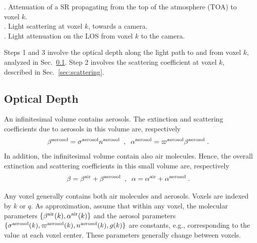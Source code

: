\documentclass[10pt,twocolumn,letterpaper]{article}
\newcommand{\yoavcomment}[1]{}
\renewcommand{\yoavcomment}[1]{#1} %
\begin{document}
\vspace{-0.35cm}
. Attenuation of a SR propagating from the top of the atmosphere
  (TOA) to voxel $k$. \\

\vspace{-0.35cm}
. Light scattering at voxel $k$, towards a camera.\\

\vspace{-0.35cm}
. Light attenuation on the LOS from voxel $k$ to the camera.

\noindent
Steps 1 and 3 involve the optical depth
along the light path to and from voxel $k$, analyzed in Sec.~\ref{sec:optical-depth}.
Step 2 involves the scattering coefficient at voxel $k$,
described in Sec.~\ref{sec:scattering}.
%

\subsection{Optical Depth}
\label{sec:optical-depth}

An infinitesimal volume contains aerosols. The extinction and scattering coefficients due to aerosols in this volume are, respectively
\begin{equation}
  \beta^{\rm aerosol}=\sigma^{\rm aerosol} n^{\rm aerosol}
  \;\;,\;\;
  \alpha^{\rm aerosol}=\varpi^{\rm aerosol} \beta^{\rm aerosol}
  \;.
  \label{eq:betaer}
\end{equation}
In addition, the infinitesimal volume contain also air molecules. Hence, the overall
extinction and scattering coefficients in this small volume are, respectively
\begin{equation}
  \beta=\beta^{\rm air}+\beta^{\rm aerosol}
  \;\;,\;\;
  \alpha=\alpha^{\rm air}+\alpha^{\rm aerosol}
  \;.
  \label{eq:betair}
\end{equation}

Any voxel generally contains both air molecules and aerosols. Voxels are indexed by $k$ or $q$. As approximation, assume that within any voxel, the molecular parameters
$\{ \beta^{\rm air}(k),\alpha^{\rm air}(k)\}$ and the aerosol parameters
$\{ \sigma^{\rm aerosol}(k),\varpi^{\rm aerosol}(k), n^{\rm aerosol}(k),g(k)\}$
are constants, e.g., corresponding to the value at each voxel center. These parameters generally change between voxels.
\end{document}
